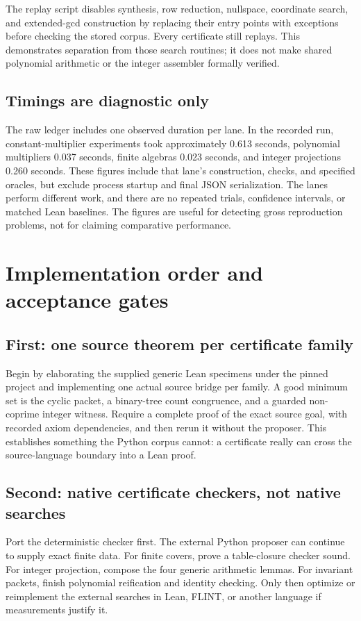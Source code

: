 The replay script disables synthesis, row reduction, nullspace, coordinate
search, and extended-gcd construction by replacing their entry points with
exceptions before checking the stored corpus. Every certificate still replays.
This demonstrates separation from those search routines; it does not make
shared polynomial arithmetic or the integer assembler formally verified.

\subsection{Timings are diagnostic only}
The raw ledger includes one observed duration per lane. In the recorded run,
constant-multiplier experiments took approximately 0.613 seconds, polynomial
multipliers 0.037 seconds, finite algebras 0.023 seconds, and integer projections
0.260 seconds. These figures include that lane's construction, checks, and
specified oracles, but exclude process startup and final JSON serialization.
The lanes perform different work, and there are no repeated trials, confidence
intervals, or matched Lean baselines. The figures are useful for detecting gross
reproduction problems, not for claiming comparative performance.

\section{Implementation order and acceptance gates}
\label{sec:roadmap}

\subsection{First: one source theorem per certificate family}
Begin by elaborating the supplied generic Lean specimens under the pinned
project and implementing one actual source bridge per family. A good minimum
set is the cyclic packet, a binary-tree count congruence, and a guarded
non-coprime integer witness. Require a complete proof of the exact source goal,
with recorded axiom dependencies, and then rerun it without the proposer.
This establishes something the Python corpus cannot: a certificate really can
cross the source-language boundary into a Lean proof.

\subsection{Second: native certificate checkers, not native searches}
Port the deterministic checker first. The external Python proposer can continue
to supply exact finite data. For finite covers, prove a table-closure checker
sound. For integer projection, compose the four generic arithmetic lemmas. For
invariant packets, finish polynomial reification and identity checking. Only
then optimize or reimplement the external searches in Lean, FLINT, or another
language if measurements justify it.

